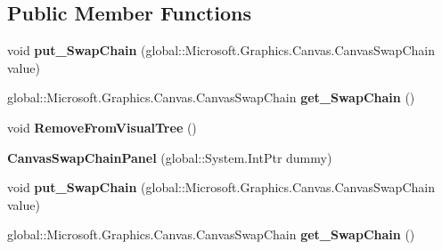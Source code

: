 \subsection*{Public Member Functions}
\begin{DoxyCompactItemize}
\item 
\mbox{\label{class_microsoft_1_1_graphics_1_1_canvas_1_1_u_i_1_1_xaml_1_1_canvas_swap_chain_panel_a96df5155a2d1f5895ca04f204345c0db}} 
void {\bfseries put\+\_\+\+Swap\+Chain} (global\+::\+Microsoft.\+Graphics.\+Canvas.\+Canvas\+Swap\+Chain value)
\item 
\mbox{\label{class_microsoft_1_1_graphics_1_1_canvas_1_1_u_i_1_1_xaml_1_1_canvas_swap_chain_panel_af61cda4ef0e97561558f45eccf72337f}} 
global\+::\+Microsoft.\+Graphics.\+Canvas.\+Canvas\+Swap\+Chain {\bfseries get\+\_\+\+Swap\+Chain} ()
\item 
\mbox{\label{class_microsoft_1_1_graphics_1_1_canvas_1_1_u_i_1_1_xaml_1_1_canvas_swap_chain_panel_acc5592500685d1434cac5b6ea81af98b}} 
void {\bfseries Remove\+From\+Visual\+Tree} ()
\item 
\mbox{\label{class_microsoft_1_1_graphics_1_1_canvas_1_1_u_i_1_1_xaml_1_1_canvas_swap_chain_panel_ac356fa1d93e6b758dff25d10d7557ee2}} 
{\bfseries Canvas\+Swap\+Chain\+Panel} (global\+::\+System.\+Int\+Ptr dummy)
\item 
\mbox{\label{class_microsoft_1_1_graphics_1_1_canvas_1_1_u_i_1_1_xaml_1_1_canvas_swap_chain_panel_a96df5155a2d1f5895ca04f204345c0db}} 
void {\bfseries put\+\_\+\+Swap\+Chain} (global\+::\+Microsoft.\+Graphics.\+Canvas.\+Canvas\+Swap\+Chain value)
\item 
\mbox{\label{class_microsoft_1_1_graphics_1_1_canvas_1_1_u_i_1_1_xaml_1_1_canvas_swap_chain_panel_af61cda4ef0e97561558f45eccf72337f}} 
global\+::\+Microsoft.\+Graphics.\+Canvas.\+Canvas\+Swap\+Chain {\bfseries get\+\_\+\+Swap\+Chain} ()

\end{DoxyCompactItemize}
